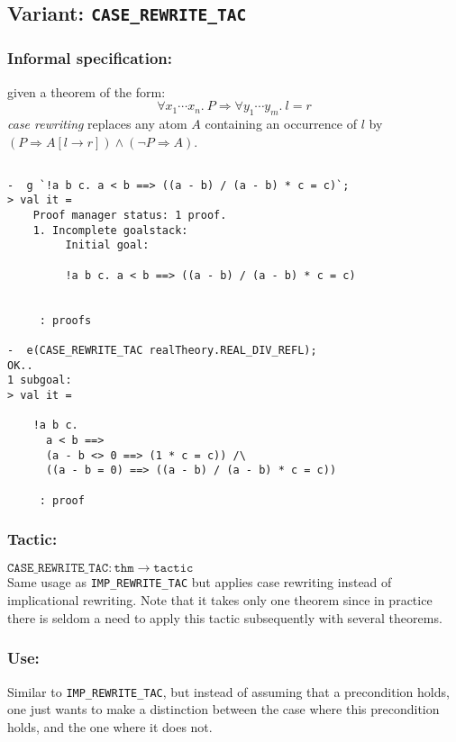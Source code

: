 \documentclass{llncs}
\newcommand*\IMPREWRITETAC{\texttt{IMP\_REWRITE\_TAC}\xspace}
\newcommand*\CASETAC{\texttt{CASE\_REWRITE\_TAC}\xspace}
\begin{document}
  \subsection{Variant: \CASETAC}
		\subsubsection{Informal specification:}
		given a theorem of the form:
    \[\forall x_1\cdots x_n.\ P \Rightarrow \forall y_1\cdots y_m.\ l = r\]
    \emph{case rewriting} replaces any atom $A$ containing an occurrence of $l$
    by $(P \Rightarrow A[l\to r]) \wedge (\neg P \Rightarrow A)$.

    \begin{example}
    \begin{verbatim}

-  g `!a b c. a < b ==> ((a - b) / (a - b) * c = c)`;
> val it =
    Proof manager status: 1 proof.
    1. Incomplete goalstack:
         Initial goal:
    
         !a b c. a < b ==> ((a - b) / (a - b) * c = c)
    
    
     : proofs

-  e(CASE_REWRITE_TAC realTheory.REAL_DIV_REFL);
OK..
1 subgoal:
> val it =
    
    !a b c.
      a < b ==>
      (a - b <> 0 ==> (1 * c = c)) /\
      ((a - b = 0) ==> ((a - b) / (a - b) * c = c))
    
     : proof \end{verbatim}
    \end{example}

		\subsubsection{Tactic:}
		$\mathtt{\CASETAC: thm \to tactic}$\\
    Same usage as \IMPREWRITETAC but applies case rewriting instead of implicational rewriting.
    Note that it takes only one theorem since in practice there is
    seldom a need to apply this tactic subsequently with several theorems.

    \subsubsection{Use:} Similar to \IMPREWRITETAC, but instead of assuming that a precondition holds,
    one just wants to make a distinction between the case where this precondition holds, and the one where it
    does not.
\end{document}
